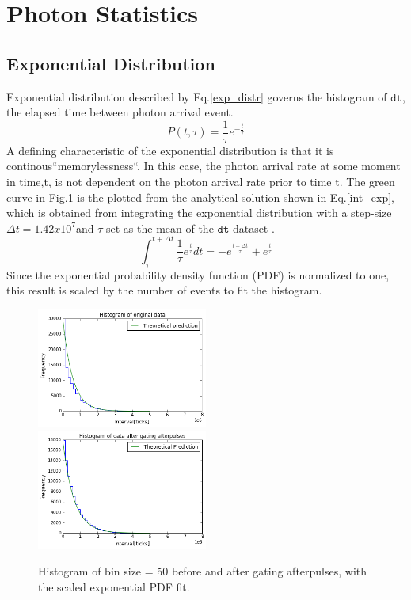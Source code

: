 \documentclass[authoryear, 12pt,5p, times]{elsarticle}
\begin{document}
\section{Photon Statistics\label{pstats}}
	
 	\subsection{Exponential Distribution}
 	Exponential distribution described by Eq.\ref{exp_distr} governs the histogram of $\texttt{dt}$, the elapsed time between photon arrival event.
\begin{equation} \label{exp_distr}
 P(t,\tau)=\frac{1}{\tau}e^{-\frac{t}{\tau}}
\end{equation}
 	 A defining characteristic of the exponential distribution is that it is continous``memorylessness``. In this case, the photon arrival rate at some moment in time,t, is not dependent on the photon arrival rate prior to time t.  The green curve in Fig.\ref{fitted_histo_gate_or_no} is the plotted from the analytical solution shown in Eq.\ref{int_exp}, which is obtained from integrating the exponential distribution with a step-size $\Delta t =1.42x10^7$and  $\tau$ set as the mean of the $\texttt{dt}$ dataset .  
 	 \begin{equation}\label{int_exp}
 	 \int^{t+\Delta t}_\tau\frac{1}{\tau}e^\frac{t}{\tau}dt=-e^\frac{t+\Delta t}{\tau}+e^\frac{t}{\tau}
	\end{equation} 	  
Since the exponential probability density function (PDF) is normalized to one, this result is scaled by the number of events to fit the histogram.
 	\begin{figure}[h]
		\includegraphics[width=0.5\textwidth]{figures/fitted_histo}
		\includegraphics[width=0.5\textwidth]{figures/fitted_histo_with_gating}
		\caption{Histogram of bin size = 50 before and after gating afterpulses, with the scaled exponential PDF fit.}
		\label{fitted_histo_gate_or_no}
	\end{figure}
\end{document}
